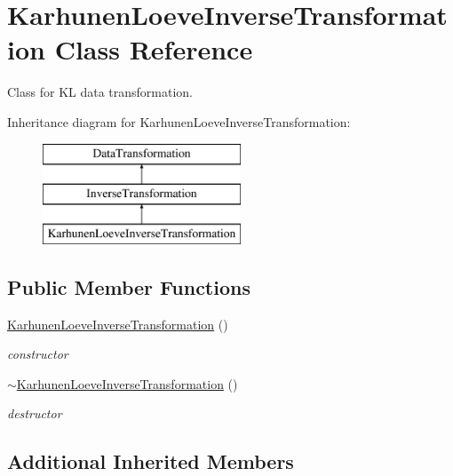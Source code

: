 \section{Karhunen\+Loeve\+Inverse\+Transformation Class Reference}
\label{classPecos_1_1KarhunenLoeveInverseTransformation}


Class for KL data transformation.  


Inheritance diagram for Karhunen\+Loeve\+Inverse\+Transformation\+:\begin{figure}[H]
\begin{center}
\leavevmode
\includegraphics[height=3.000000cm]{classPecos_1_1KarhunenLoeveInverseTransformation}
\end{center}
\end{figure}
\subsection*{Public Member Functions}
\begin{DoxyCompactItemize}
\item 
\hyperlink{classPecos_1_1KarhunenLoeveInverseTransformation_a69c8749d0456df8ddcf8fd460718199b}{Karhunen\+Loeve\+Inverse\+Transformation} ()\label{classPecos_1_1KarhunenLoeveInverseTransformation_a69c8749d0456df8ddcf8fd460718199b}

\begin{DoxyCompactList}\small\item\em constructor \end{DoxyCompactList}\item 
\hyperlink{classPecos_1_1KarhunenLoeveInverseTransformation_ad52d3889f7a6cee422a43da4102fc1a9}{$\sim$\+Karhunen\+Loeve\+Inverse\+Transformation} ()\label{classPecos_1_1KarhunenLoeveInverseTransformation_ad52d3889f7a6cee422a43da4102fc1a9}

\begin{DoxyCompactList}\small\item\em destructor \end{DoxyCompactList}\end{DoxyCompactItemize}
\subsection*{Additional Inherited Members}


